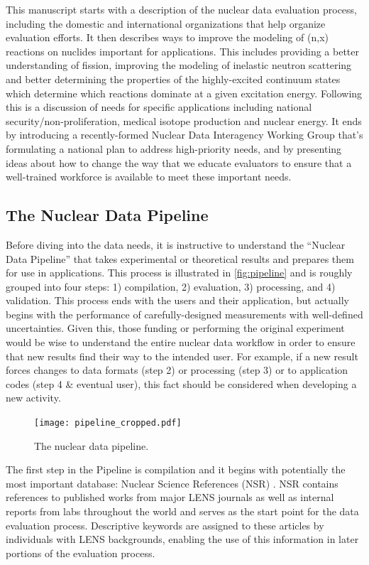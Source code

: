 \documentclass[letterpaper]{ar-1col}
\begin{document}
This manuscript starts with a description of the nuclear data evaluation process, including the domestic and international organizations that help organize evaluation efforts.  It  then describes ways to improve the modeling of (n,x) reactions on nuclides important for applications.  This includes providing a better understanding of fission, improving the modeling of inelastic neutron scattering and better determining the properties of the highly-excited continuum states which determine which reactions dominate at a given excitation energy.
 Following this is a discussion of needs for specific applications including national security/non-proliferation, medical isotope production and nuclear energy.
 It ends by introducing a recently-formed Nuclear Data Interagency Working Group that's formulating a national plan to address high-priority needs, and by presenting ideas about how to change the way that we educate evaluators to ensure that a well-trained workforce is available to meet these important needs.

\subsection{The Nuclear Data Pipeline}
\label{sec:pipeline}

Before diving into the data needs, it is instructive to understand the \enquote{Nuclear Data Pipeline} that takes experimental or theoretical results and prepares them for use in applications.
 This process is illustrated in \autoref{fig:pipeline} and is roughly grouped into four steps: 1) compilation, 2) evaluation, 3) processing, and 4) validation.
 This process ends with the users and their application, but actually begins with the performance of carefully-designed measurements with well-defined uncertainties.
 Given this, those funding or performing the original experiment would be wise to understand the entire nuclear data workflow in order to ensure that new results find their way to the intended user.
 For example, if a new result forces changes to data formats (step 2) or processing (step 3) or to application codes (step 4 \& eventual user), this fact should be considered when developing a new activity.

 
\begin{figure}
\centering
\texttt{[image: pipeline\_cropped.pdf]}
\caption{\label{fig:pipeline}The nuclear data pipeline.}
\end{figure}
 
 
The first step in the Pipeline is compilation and it begins with potentially the most important database: Nuclear Science References (NSR) \cite{NSR}.
 NSR contains references to published works from major LENS journals as well as internal reports from labs throughout the world and serves as the start point for the data evaluation process.
Descriptive keywords are assigned to these articles by individuals with LENS backgrounds, enabling the use of this information in later portions of the evaluation process.
  
\end{document}
